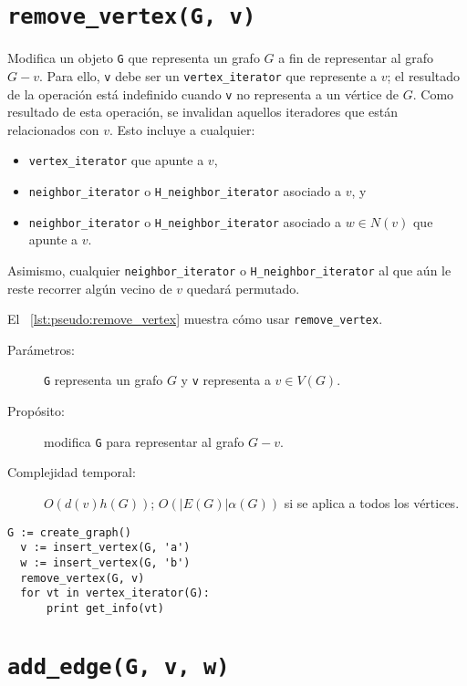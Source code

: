 \documentclass[%
    a4paper,%
    fontsize=12pt,%
    DIV=12,
    twoside,%
    openright,%
    titlepage=true,%
    headsepline,%
    toc=bibliography,%
    parskip=half,%
    cleardoublepage=empty,%
    headings=big,%
]{scrbook}
\makeatletter
\newcommand{\Code}[1]{\lstinline[basicstyle={\ttfamily}]@#1@}
\makeatother
\begin{document}
\section{\texorpdfstring{\Code{remove_vertex(G, v)}}{remove\_vertex(G, v)}}
\label{sec:tad grafo:remove-vertex}

Modifica un objeto \Code{G} que representa un grafo $G$ a fin de representar al grafo $G - v$.  Para ello, \Code{v} debe ser un \Code{vertex_iterator} que represente a $v$; el resultado de la operación está indefinido cuando \Code{v} no representa a un vértice de $G$.  Como resultado de esta operación, se invalidan aquellos iteradores que están relacionados con $v$.  Esto incluye a cualquier:
\begin{itemize}
  \item \Code{vertex_iterator} que apunte a $v$, 
  \item \Code{neighbor_iterator} o \Code{H_neighbor_iterator} asociado a $v$, y 
  \item \Code{neighbor_iterator} o \Code{H_neighbor_iterator} asociado a $w \in N(v)$ que apunte a $v$.
\end{itemize}
Asimismo, cualquier \Code{neighbor_iterator} o \Code{H_neighbor_iterator} al que aún le reste recorrer algún vecino de $v$ quedará permutado.
  
El \lstlistingname~\ref{lst:pseudo:remove_vertex} muestra cómo usar \Code{remove_vertex}.
  
\begin{description}
  \item [Parámetros:] \Code{G} representa un grafo $G$ y \Code{v} representa a $v \in V(G)$.
  \item [Propósito:] modifica \Code{G} para representar al grafo $G - v$.
  \item [Complejidad temporal:] $O(d(v)h(G))$; $O(|E(G)|\alpha(G))$ si se aplica a todos los vértices.
\end{description}


\begin{lstlisting}[caption={Ejemplo de uso de \Code{remove_vertex} para imprimir `b'. Ver Sección~\ref{sec:tad grafo:vertex-iterator} para más información de \Code{vertex_iterator}.},gobble=2,float=ht,label={lst:pseudo:remove_vertex},emph={remove_vertex}]
  G := create_graph()
  v := insert_vertex(G, 'a')
  w := insert_vertex(G, 'b')
  remove_vertex(G, v)
  for vt in vertex_iterator(G):
      print get_info(vt)
\end{lstlisting}


\section{\texorpdfstring{\Code{add_edge(G, v, w)}}{add\_edge(G, v, w)}}
\label{sec:tad grafo:add-edge}
\end{document}
